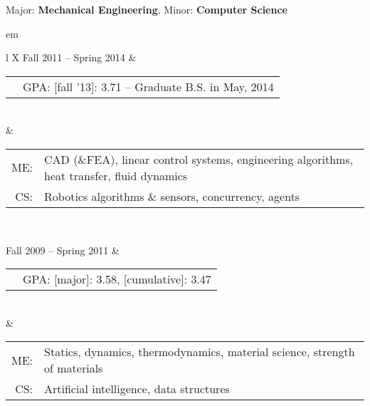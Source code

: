 

{\centering \large{Major: \textbf{Mechanical Engineering}, Minor: \textbf{Computer Science}} \par }

	
{ em
\begin{tabu}{ L{\tabularIndent} X } \hhline{==}
	Fall 2011 -- Spring 2014 & 
	\begin{tabular}{ l | l }
		\mysubsection{University of Southern California} & GPA: [fall '13]: 3.71 -- Graduate B.S. in May, 2014 \\ \cline{1-1}
	\end{tabular}
	\\
	&
	\setlength{\tabcolsep}{0.0 em}
	\begin{tabular}{ r l }
		ME: \quad &
		CAD (\&FEA), linear control systems, engineering algorithms, heat transfer, fluid dynamics 
		\\
		CS: \quad &
		Robotics algorithms \& sensors, concurrency, agents \\
	\end{tabular}
	
\\ \hhline{==}

	Fall 2009 -- Spring 2011 & 
	\begin{tabular}{ l | l }
		\mysubsection{University of Massachusetts, Amherst} & GPA: [major]: 3.58, [cumulative]: 3.47 \\ \cline{1-1}
	\end{tabular}
	\\
	&
	\setlength{\tabcolsep}{0 em}
	\begin{tabular}{ r l }
		ME: \quad &
		Statics, dynamics, thermodynamics, material science, strength of materials
		\\
		CS: \quad &
		Artificial intelligence, data structures \\
	\end{tabular}
\end{tabu}}